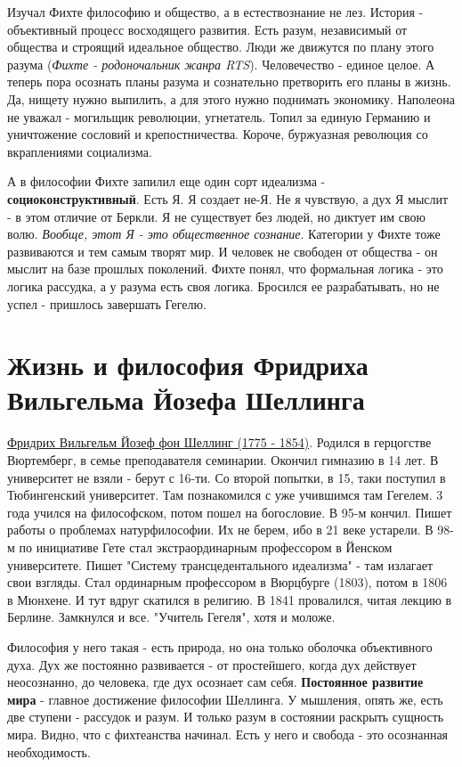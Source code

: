 Изучал Фихте философию и общество, а в естествознание не лез. История - объективный процесс восходящего развития. Есть разум, независимый от общества и строящий идеальное общество. Люди же движутся по плану этого разума (\textit{Фихте - родоночальник жанра RTS}). Человечество - единое целое. А теперь пора осознать планы разума и сознательно претворить его планы в жизнь. Да, нищету нужно выпилить, а для этого нужно поднимать экономику. Наполеона не уважал - могильщик революции, угнетатель. Топил за единую Германию и уничтожение сословий и крепостничества. Короче, буржуазная революция со вкраплениями социализма.

А в философии Фихте запилил еще один сорт идеализма - \textbf{социоконструктивный}. Есть Я. Я создает не-Я. Не я чувствую, а дух Я мыслит - в этом отличие от Беркли. Я не существует без людей, но диктует им свою волю. \textit{Вообще, этот Я - это общественное сознание}. Категории у Фихте тоже развиваются и тем самым творят мир. И человек не свободен от общества - он мыслит на базе прошлых поколений. Фихте понял, что формальная логика - это логика рассудка, а у разума есть своя логика. Бросился ее разрабатывать, но не успел - пришлось завершать Гегелю.  

\section{Жизнь и философия Фридриха Вильгельма Йозефа Шеллинга}
\underline{Фридрих Вильгельм Йозеф фон Шеллинг (1775 - 1854)}. Родился в герцогстве Вюртемберг, в семье преподавателя семинарии. Окончил гимназию в 14 лет. В университет не взяли - берут с 16-ти. Со второй попытки, в 15, таки поступил в Тюбингенский университет. Там познакомился с уже учившимся там Гегелем. 3 года учился на философском, потом пошел на богословие. В 95-м кончил. Пишет работы о проблемах натурфилософии. Их не берем, ибо в 21 веке устарели. В 98-м по инициативе Гете стал экстраординарным профессором в Йенском университете. Пишет "Систему трансцедентального идеализма" - там излагает свои взгляды. Стал ординарным профессором в Вюрцбурге (1803), потом в 1806 в Мюнхене. И тут вдруг скатился в религию. В 1841 провалился, читая лекцию в Берлине. Замкнулся и все. "Учитель Гегеля", хотя и моложе.

Философия у него такая - есть природа, но она только оболочка объективного духа. Дух же постоянно развивается - от простейшего, когда дух действует неосознанно, до человека, где дух осознает сам себя. \textbf{Постоянное развитие мира} - главное достижение философии Шеллинга. У мышления, опять же, есть две ступени - рассудок и разум. И только разум в состоянии раскрыть сущность мира. Видно, что с фихтеанства начинал. Есть у него и свобода - это осознанная необходимость.

